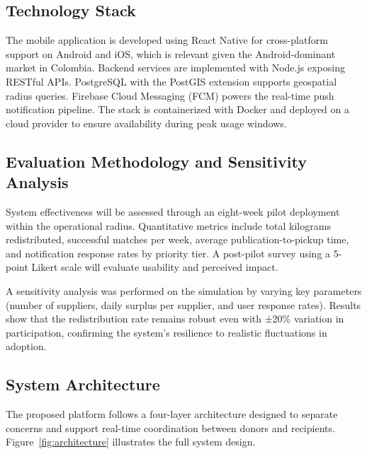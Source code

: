 \documentclass[conference]{IEEEtran}
\begin{document}
\subsection{Technology Stack}
The mobile application is developed using React Native for cross-platform support on Android and iOS, which is relevant given the Android-dominant market in Colombia. Backend services are implemented with Node.js exposing RESTful APIs. PostgreSQL with the PostGIS extension supports geospatial radius queries. Firebase Cloud Messaging (FCM) powers the real-time push notification pipeline. The stack is containerized with Docker and deployed on a cloud provider to ensure availability during peak usage windows.

\subsection{Evaluation Methodology and Sensitivity Analysis}
System effectiveness will be assessed through an eight-week pilot deployment within the operational radius. Quantitative metrics include total kilograms redistributed, successful matches per week, average publication-to-pickup time, and notification response rates by priority tier. A post-pilot survey using a 5-point Likert scale will evaluate usability and perceived impact.

A sensitivity analysis was performed on the simulation by varying key parameters (number of suppliers, daily surplus per supplier, and user response rates). Results show that the redistribution rate remains robust even with ±20\% variation in participation, confirming the system’s resilience to realistic fluctuations in adoption.

\subsection{System Architecture}

The proposed platform follows a four-layer architecture designed to separate concerns and support real-time coordination between donors and recipients. Figure~\ref{fig:architecture} illustrates the full system design.
\end{document}
